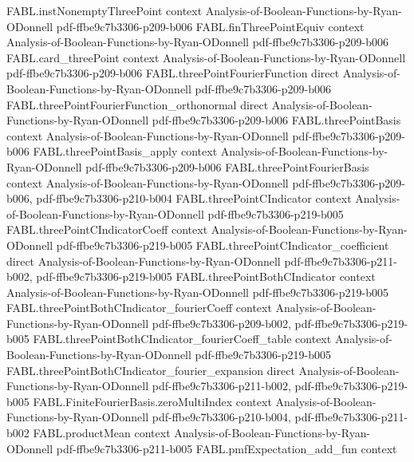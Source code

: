 \begin{theorem}
\proofstep
  {FABL.instNonemptyThreePoint}
  {context}
  {Analysis-of-Boolean-Functions-by-Ryan-ODonnell}
  {pdf-ffbe9c7b3306-p209-b006}
\proofstep
  {FABL.finThreePointEquiv}
  {context}
  {Analysis-of-Boolean-Functions-by-Ryan-ODonnell}
  {pdf-ffbe9c7b3306-p209-b006}
\proofstep
  {FABL.card_threePoint}
  {context}
  {Analysis-of-Boolean-Functions-by-Ryan-ODonnell}
  {pdf-ffbe9c7b3306-p209-b006}
\proofstep
  {FABL.threePointFourierFunction}
  {direct}
  {Analysis-of-Boolean-Functions-by-Ryan-ODonnell}
  {pdf-ffbe9c7b3306-p209-b006}
\proofstep
  {FABL.threePointFourierFunction_orthonormal}
  {direct}
  {Analysis-of-Boolean-Functions-by-Ryan-ODonnell}
  {pdf-ffbe9c7b3306-p209-b006}
\proofstep
  {FABL.threePointBasis}
  {context}
  {Analysis-of-Boolean-Functions-by-Ryan-ODonnell}
  {pdf-ffbe9c7b3306-p209-b006}
\proofstep
  {FABL.threePointBasis_apply}
  {context}
  {Analysis-of-Boolean-Functions-by-Ryan-ODonnell}
  {pdf-ffbe9c7b3306-p209-b006}
\proofstep
  {FABL.threePointFourierBasis}
  {context}
  {Analysis-of-Boolean-Functions-by-Ryan-ODonnell}
  {pdf-ffbe9c7b3306-p209-b006,
    pdf-ffbe9c7b3306-p210-b004}
\proofstep
  {FABL.threePointCIndicator}
  {context}
  {Analysis-of-Boolean-Functions-by-Ryan-ODonnell}
  {pdf-ffbe9c7b3306-p219-b005}
\proofstep
  {FABL.threePointCIndicatorCoeff}
  {context}
  {Analysis-of-Boolean-Functions-by-Ryan-ODonnell}
  {pdf-ffbe9c7b3306-p219-b005}
\proofstep
  {FABL.threePointCIndicator_coefficient}
  {direct}
  {Analysis-of-Boolean-Functions-by-Ryan-ODonnell}
  {pdf-ffbe9c7b3306-p211-b002,
    pdf-ffbe9c7b3306-p219-b005}
\proofstep
  {FABL.threePointBothCIndicator}
  {context}
  {Analysis-of-Boolean-Functions-by-Ryan-ODonnell}
  {pdf-ffbe9c7b3306-p219-b005}
\proofstep
  {FABL.threePointBothCIndicator_fourierCoeff}
  {context}
  {Analysis-of-Boolean-Functions-by-Ryan-ODonnell}
  {pdf-ffbe9c7b3306-p209-b002,
    pdf-ffbe9c7b3306-p219-b005}
\proofstep
  {FABL.threePointBothCIndicator_fourierCoeff_table}
  {context}
  {Analysis-of-Boolean-Functions-by-Ryan-ODonnell}
  {pdf-ffbe9c7b3306-p219-b005}
\proofstep
  {FABL.threePointBothCIndicator_fourier_expansion}
  {direct}
  {Analysis-of-Boolean-Functions-by-Ryan-ODonnell}
  {pdf-ffbe9c7b3306-p211-b002,
    pdf-ffbe9c7b3306-p219-b005}
\proofstep
  {FABL.FiniteFourierBasis.zeroMultiIndex}
  {context}
  {Analysis-of-Boolean-Functions-by-Ryan-ODonnell}
  {pdf-ffbe9c7b3306-p210-b004,
    pdf-ffbe9c7b3306-p211-b002}
\proofstep
  {FABL.productMean}
  {context}
  {Analysis-of-Boolean-Functions-by-Ryan-ODonnell}
  {pdf-ffbe9c7b3306-p211-b005}
\proofstep
  {FABL.pmfExpectation_add_fun}
  {context}

\end{theorem}
